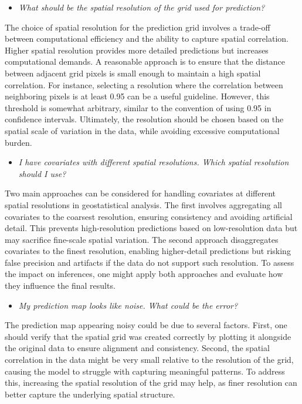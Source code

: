 \documentclass[
  letterpaper,
]{krantz}
\providecommand{\tightlist}{%
  \setlength{\itemsep}{0pt}\setlength{\parskip}{0pt}}
\begin{document}
\begin{itemize}
\tightlist
\item
  \emph{What should be the spatial resolution of the grid used for
  prediction?}
\end{itemize}

The choice of spatial resolution for the prediction grid involves a
trade-off between computational efficiency and the ability to capture
spatial correlation. Higher spatial resolution provides more detailed
predictions but increases computational demands. A reasonable approach
is to ensure that the distance between adjacent grid pixels is small
enough to maintain a high spatial correlation. For instance, selecting a
resolution where the correlation between neighboring pixels is at least
0.95 can be a useful guideline. However, this threshold is somewhat
arbitrary, similar to the convention of using 0.95 in confidence
intervals. Ultimately, the resolution should be chosen based on the
spatial scale of variation in the data, while avoiding excessive
computational burden.

\begin{itemize}
\tightlist
\item
  \emph{I have covariates with different spatial resolutions. Which
  spatial resolution should I use?}
\end{itemize}

Two main approaches can be considered for handling covariates at
different spatial resolutions in geostatistical analysis. The first
involves aggregating all covariates to the coarsest resolution, ensuring
consistency and avoiding artificial detail. This prevents
high-resolution predictions based on low-resolution data but may
sacrifice fine-scale spatial variation. The second approach
disaggregates covariates to the finest resolution, enabling
higher-detail predictions but risking false precision and artifacts if
the data do not support such resolution. To assess the impact on
inferences, one might apply both approaches and evaluate how they
influence the final results.

\begin{itemize}
\tightlist
\item
  \emph{My prediction map looks like noise. What could be the error?}
\end{itemize}

The prediction map appearing noisy could be due to several factors.
First, one should verify that the spatial grid was created correctly by
plotting it alongside the original data to ensure alignment and
consistency. Second, the spatial correlation in the data might be very
small relative to the resolution of the grid, causing the model to
struggle with capturing meaningful patterns. To address this, increasing
the spatial resolution of the grid may help, as finer resolution can
better capture the underlying spatial structure.
\end{document}
